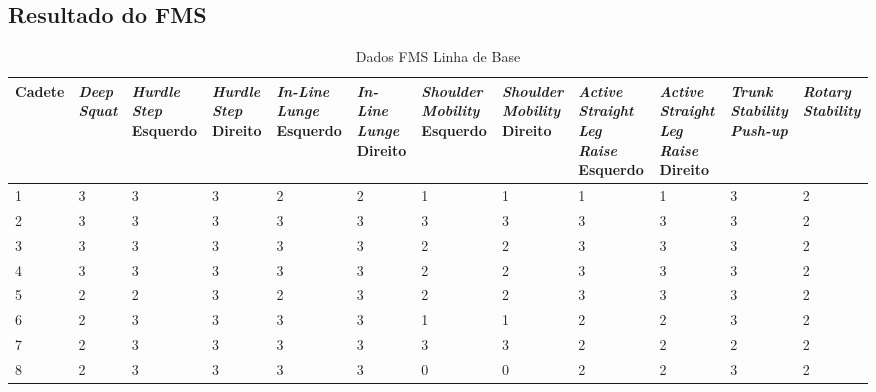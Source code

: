 \begin{landscape}
    
    \chapter{Resultado do \acrshort{FMS}}
    \label{ap:fms}
    
    \begin{table}[h]
        \centering
        \caption{Dados FMS Linha de Base}
        \label{tab:fmsBase}
        \renewcommand{\arraystretch}{1.3}  %
        \begin{adjustbox}{scale=0.9}
        \begin{tabular}{|p{1.8cm}|p{1.6cm}|p{1.6cm}|p{1.6cm}|p{1.6cm}|p{1.6cm}|p{1.6cm}|p{1.6cm}|p{1.6cm}|p{1.6cm}|p{1.6cm}|p{1.6cm}|}
            \hline
            \textbf{Cadete} & \textbf{\textit{Deep Squat}} & \textbf{\textit{Hurdle Step} Esquerdo} & \textbf{\textit{Hurdle Step} Direito} & \textbf{\textit{In-Line Lunge} Esquerdo} & \textbf{\textit{In-Line Lunge} Direito} & \textbf{\textit{Shoulder Mobility} Esquerdo} & \textbf{\textit{Shoulder Mobility} Direito} & \textbf{\textit{Active Straight Leg Raise} Esquerdo} & \textbf{\textit{Active Straight Leg Raise} Direito} & \textbf{\textit{Trunk Stability Push-up}} & \textbf{\textit{Rotary Stability}} \\
            \hline
            1 & 3 & 3 & 3 & 2 & 2 & 1 & 1 & 1 & 1 & 3 & 2 \\
            2 & 3 & 3 & 3 & 3 & 3 & 3 & 3 & 3 & 3 & 3 & 2 \\
            3 & 3 & 3 & 3 & 3 & 3 & 2 & 2 & 3 & 3 & 3 & 2 \\
            4 & 3 & 3 & 3 & 3 & 3 & 2 & 2 & 3 & 3 & 3 & 2 \\
            5 & 2 & 2 & 3 & 2 & 3 & 2 & 2 & 3 & 3 & 3 & 2 \\
            6 & 2 & 3 & 3 & 3 & 3 & 1 & 1 & 2 & 2 & 3 & 2 \\
            7 & 2 & 3 & 3 & 3 & 3 & 3 & 3 & 2 & 2 & 2 & 2 \\
            8 & 2 & 3 & 3 & 3 & 3 & 0 & 0 & 2 & 2 & 3 & 2 \\
            \hline
        \end{tabular}
        \end{adjustbox}
    \end{table}
    

\end{landscape}
